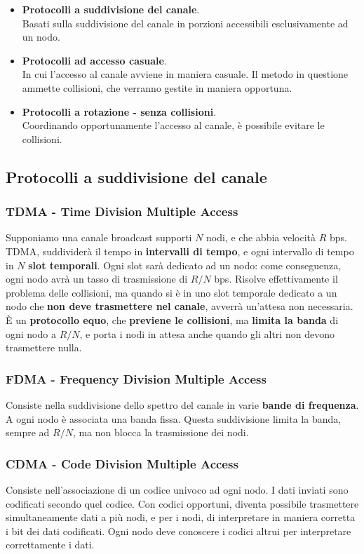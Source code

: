 \begin{itemize}
	\item \textbf{Protocolli a suddivisione del canale}.\\
	Basati sulla suddivisione del canale in porzioni accessibili esclusivamente ad un nodo.
	\item \textbf{Protocolli ad accesso casuale}.\\
	In cui l'accesso al canale avviene in maniera casuale. Il metodo in questione ammette collisioni, che verranno gestite in maniera opportuna.
	\item \textbf{Protocolli a rotazione - senza collisioni}.\\
	Coordinando opportunamente l’accesso al canale, è possibile evitare le collisioni.
\end{itemize}

\subsection{Protocolli a suddivisione del canale}

\subsubsection{TDMA - Time Division Multiple Access}
Supponiamo una canale broadcast supporti $N$ nodi, e che abbia velocità $R$ bps.\\
TDMA, suddividerà il tempo in \textbf{intervalli di tempo}, e ogni intervallo di tempo in $N$ \textbf{slot temporali}. Ogni slot sarà dedicato ad un nodo: come conseguenza, ogni nodo avrà un tasso di trasmissione di $R/N$ bps. Risolve effettivamente il problema delle collisioni, ma quando si è in uno slot temporale dedicato a un nodo che \textbf{non deve trasmettere nel canale}, avverrà un'attesa non necessaria. 
È un \textbf{protocollo equo}, che \textbf{previene le collisioni}, ma \textbf{limita la banda} di ogni nodo a $R/N$, e porta i nodi in attesa anche quando gli altri non devono trasmettere nulla.

\subsubsection{FDMA - Frequency Division Multiple Access}
Consiste nella suddivisione dello spettro del canale in varie \textbf{bande di frequenza}. A ogni nodo è associata una banda fissa.
Questa suddivisione limita la banda, sempre ad $R/N$, ma non blocca la trasmissione dei nodi.

\subsubsection{CDMA - Code Division Multiple Access}
Consiste nell'associazione di un codice univoco ad ogni nodo. I dati inviati sono codificati secondo quel codice. Con codici opportuni, diventa possibile trasmettere simultaneamente dati a più nodi, e per i nodi, di interpretare in maniera corretta i bit dei dati codificati. Ogni nodo deve conoscere i codici altrui per interpretare correttamente i dati.

